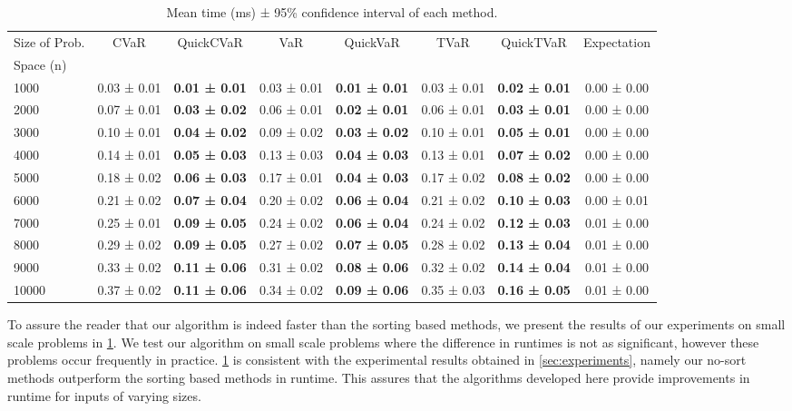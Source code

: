 \documentclass[10pt]{article} %
\begin{document}
\begin{table} 
\begin{tabular}{lccccccc}
\toprule
 Size of Prob. & CVaR & QuickCVaR & VaR & QuickVaR & TVaR & QuickTVaR & Expectation \\
Space (n) &  &  &  &  &  &  &  \\
\midrule
1000 & 0.03 ± 0.01 & \textbf{0.01 ± 0.01} & 0.03 ± 0.01 & \textbf{0.01 ± 0.01} & 0.03 ± 0.01 & \textbf{0.02 ± 0.01} & 0.00 ± 0.00 \\
2000 & 0.07 ± 0.01 & \textbf{0.03 ± 0.02} & 0.06 ± 0.01 & \textbf{0.02 ± 0.01} & 0.06 ± 0.01 & \textbf{0.03 ± 0.01} & 0.00 ± 0.00 \\
3000 & 0.10 ± 0.01 & \textbf{0.04 ± 0.02} & 0.09 ± 0.02 & \textbf{0.03 ± 0.02} & 0.10 ± 0.01 & \textbf{0.05 ± 0.01} & 0.00 ± 0.00 \\
4000 & 0.14 ± 0.01 & \textbf{0.05 ± 0.03} & 0.13 ± 0.03 & \textbf{0.04 ± 0.03} & 0.13 ± 0.01 & \textbf{0.07 ± 0.02} & 0.00 ± 0.00 \\
5000 & 0.18 ± 0.02 & \textbf{0.06 ± 0.03} & 0.17 ± 0.01 & \textbf{0.04 ± 0.03} & 0.17 ± 0.02 & \textbf{0.08 ± 0.02} & 0.00 ± 0.00 \\
6000 & 0.21 ± 0.02 & \textbf{0.07 ± 0.04} & 0.20 ± 0.02 & \textbf{0.06 ± 0.04} & 0.21 ± 0.02 & \textbf{0.10 ± 0.03} & 0.00 ± 0.01 \\
7000 & 0.25 ± 0.01 & \textbf{0.09 ± 0.05} & 0.24 ± 0.02 & \textbf{0.06 ± 0.04} & 0.24 ± 0.02 & \textbf{0.12 ± 0.03} & 0.01 ± 0.00 \\
8000 & 0.29 ± 0.02 & \textbf{0.09 ± 0.05} & 0.27 ± 0.02 & \textbf{0.07 ± 0.05} & 0.28 ± 0.02 & \textbf{0.13 ± 0.04} & 0.01 ± 0.00 \\
9000 & 0.33 ± 0.02 & \textbf{0.11 ± 0.06} & 0.31 ± 0.02 & \textbf{0.08 ± 0.06} & 0.32 ± 0.02 & \textbf{0.14 ± 0.04} & 0.01 ± 0.00 \\
10000 & 0.37 ± 0.02 & \textbf{0.11 ± 0.06} & 0.34 ± 0.02 & \textbf{0.09 ± 0.06} & 0.35 ± 0.03 & \textbf{0.16 ± 0.05} & 0.01 ± 0.00 \\
\bottomrule
\end{tabular}
\caption{Mean time (ms) ± 95\% confidence interval of each method.}
\label{tab:small_results}
\end{table}

To assure the reader that our algorithm is indeed faster than the sorting based methods, we present the results of our experiments on small scale problems in \cref{tab:small_results}. 
We test our algorithm on small scale problems where the difference in runtimes is not as significant, however these problems occur frequently in practice. \cref{tab:small_results} is consistent with the experimental results obtained in \cref{sec:experiments}, namely our no-sort methods outperform the sorting based methods in runtime. This assures that the algorithms developed here provide improvements in runtime for inputs of varying sizes.
\end{document}
